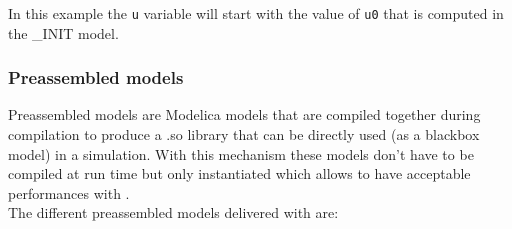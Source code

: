 \documentclass[a4paper, 12pt]{report}
\begin{document}
In this example the \lstinline[language=Modelica]{u} variable will start with the value of \lstinline[language=Modelica]{u0} that is computed in the \_INIT model.

\subsubsection{Preassembled models}

Preassembled models are Modelica models that are compiled together during \Dynawo compilation to produce a .so library that can be directly used (as a blackbox model) in a simulation. With this mechanism these models don't have to be compiled at run time but only instantiated which allows to have acceptable performances with \Dynawo. \\

The different preassembled models delivered with \Dynawo are:
\end{document}
